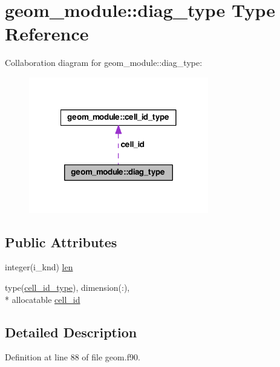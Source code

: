 \hypertarget{structgeom__module_1_1diag__type}{\section{geom\-\_\-module\-:\-:diag\-\_\-type Type Reference}
\label{structgeom__module_1_1diag__type}
}


Collaboration diagram for geom\-\_\-module\-:\-:diag\-\_\-type\-:\nopagebreak
\begin{figure}[H]
\begin{center}
\leavevmode
\includegraphics[width=222pt]{structgeom__module_1_1diag__type__coll__graph}
\end{center}
\end{figure}
\subsection*{Public Attributes}
\begin{DoxyCompactItemize}
\item 
integer(i\-\_\-knd) \hyperlink{structgeom__module_1_1diag__type_aea93a15b2b174bdfdc9912a201bd48e4}{len}
\item 
type(\hyperlink{structgeom__module_1_1cell__id__type}{cell\-\_\-id\-\_\-type}), dimension(\-:), \\*
allocatable \hyperlink{structgeom__module_1_1diag__type_a4a224a6b718e7f700346107791b76c68}{cell\-\_\-id}
\end{DoxyCompactItemize}


\subsection{Detailed Description}


Definition at line 88 of file geom.\-f90.



